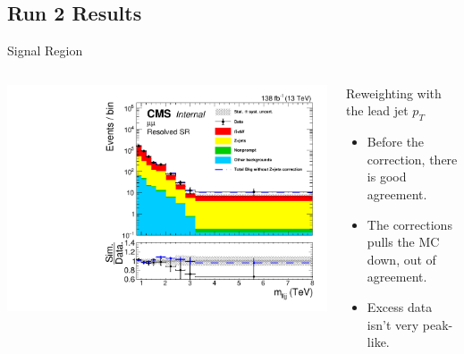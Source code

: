 \documentclass[aspectratio=169]{beamer}
\begin{document}
\begin{backup}
  \subsection{Run 2 Results}

  \begin{frame}{Signal Region}
    \begin{columns}
      \begin{column}{0.50\textwidth}
        \centering
        \includegraphics[width=\textwidth]{../figures/histograms/mlljj-sr-mumu.pdf}
      \end{column}
      \begin{column}{0.50\textwidth}
          \centering
          \resizebox{0.55\columnwidth}{!}{%
          
          }
  
        \vfill
        
        \begin{block}{Reweighting with the lead jet $p_T$}
          \begin{itemize}
            \item Before the correction, there is good agreement.
            \item The corrections pulls the MC down, out of agreement.
            \item Excess data isn't very peak-like.
          \end{itemize}
        \end{block}
      \end{column}
    \end{columns}
  \end{frame}
  

\end{backup}
\end{document}
